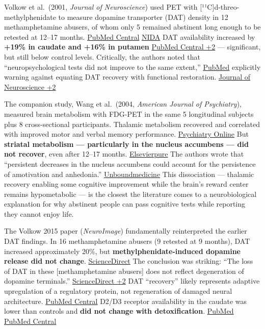 Volkow et al.~(2001, \emph{Journal of Neuroscience}) used PET with {[}¹¹C{]}d-threo-methylphenidate to measure dopamine transporter (DAT) density in 12 methamphetamine abusers, of whom only 5 remained abstinent long enough to be retested at 12--17 months. \href{https://pmc.ncbi.nlm.nih.gov/articles/PMC6763886/}{PubMed Central} \href{https://nida.nih.gov/publications/drugs-brains-behavior-science-addiction/treatment-recovery}{NIDA} DAT availability increased by \textbf{+19\% in caudate and +16\% in putamen} \href{https://pmc.ncbi.nlm.nih.gov/articles/PMC6763886/}{PubMed Central +2} --- significant, but still below control levels. Critically, the authors noted that ``neuropsychological tests did not improve to the same extent,'' \href{https://pubmed.ncbi.nlm.nih.gov/11717374/}{PubMed} explicitly warning against equating DAT recovery with functional restoration. \href{https://www.jneurosci.org/content/21/23/9414}{Journal of Neuroscience +2}

The companion study, Wang et al.~(2004, \emph{American Journal of Psychiatry}), measured brain metabolism with FDG-PET in the same 5 longitudinal subjects plus 8 cross-sectional participants. Thalamic metabolism recovered and correlated with improved motor and verbal memory performance. \href{https://psychiatryonline.org/doi/10.1176/appi.ajp.161.2.242}{Psychiatry Online} But \textbf{striatal metabolism --- particularly in the nucleus accumbens --- did not recover}, even after 12--17 months. \href{https://ohsu.elsevierpure.com/en/publications/partial-recovery-of-brain-metabolism-in-methamphetamine-abusers-a-2/}{Elsevierpure} The authors wrote that ``persistent decreases in the nucleus accumbens could account for the persistence of amotivation and anhedonia.'' \href{https://news.unboundmedicine.com/medline/citation/14754772/Partial_recovery_of_brain_metabolism_in_methamphetamine_abusers_after_protracted_abstinence_}{Unboundmedicine} This dissociation --- thalamic recovery enabling some cognitive improvement while the brain's reward center remains hypometabolic --- is the closest the literature comes to a neurobiological explanation for why abstinent people can pass cognitive tests while reporting they cannot enjoy life.

The Volkow 2015 paper (\emph{NeuroImage}) fundamentally reinterpreted the earlier DAT findings. In 16 methamphetamine abusers (9 retested at 9 months), DAT increased approximately 20\%, but \textbf{methylphenidate-induced dopamine release did not change}. \href{https://www.sciencedirect.com/science/article/abs/pii/S1053811915006461}{ScienceDirect} The conclusion was striking: ``The loss of DAT in these {[}methamphetamine abusers{]} does not reflect degeneration of dopamine terminals.'' \href{https://www.sciencedirect.com/science/article/abs/pii/S1053811915006461}{ScienceDirect +2} DAT ``recovery'' likely represents adaptive upregulation of a regulatory protein, not regeneration of damaged neural architecture. \href{https://pmc.ncbi.nlm.nih.gov/articles/PMC6763886/}{PubMed Central} D2/D3 receptor availability in the caudate was lower than controls and \textbf{did not change with detoxification}. \href{https://pubmed.ncbi.nlm.nih.gov/26208874/}{PubMed} \href{https://pmc.ncbi.nlm.nih.gov/articles/PMC3261322/}{PubMed Central}

